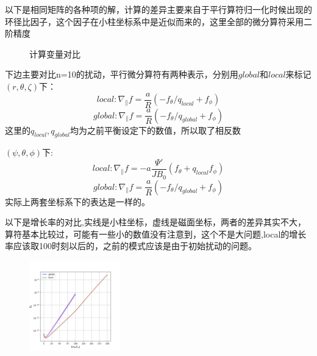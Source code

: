 \documentclass[11pt,a4paper]{article}
\begin{document}
以下是相同矩阵的各种项的解，计算的差异主要来自于平行算符归一化时候出现的环径比因子，这个因子在小柱坐标系中是近似而来的，这里全部的微分算符采用二阶精度
\begin{figure}[H]
	\centering
	\caption{计算变量对比}
\end{figure}


下边主要对比n=10的扰动，平行微分算符有两种表示，分别用$global$和$local$来标记\\
$(r,\theta,\zeta)$下：
$$ local: \nabla_{\parallel}{f} = \frac{a}{R}( -f_{\theta}/q_{local}+f_\phi ) $$
$$ global: \nabla_{\parallel}{f} = \frac{a}{R}(-f_{\theta}/q_{global}+f_\phi ) $$
这里的$q_{local},q_{global}$均为之前平衡设定下的数值，所以取了相反数

$(\psi,\theta,\phi)$下:
$$ local: \nabla_{\parallel}{f} = -a\frac{\Psi'}{JB_0}( f_{\theta}+q_{local}f_\phi ) $$
$$ global: \nabla_{\parallel}{f} = \frac{a}{R}(-f_{\theta}/q_{global}+f_\phi ) $$
实际上两套坐标系下的表达是一样的。

以下是增长率的对比,实线是小柱坐标，虚线是磁面坐标，两者的差异其实不大，算符基本比较过，可能有一些小的数值没有注意到，这个不是大问题,local的增长率应该取100时刻以后的，之前的模式应该是由于初始扰动的问题。
\begin{figure}[H]
	\centering
	\includegraphics[width=0.35\textwidth]{../psi-code/f2d/E_global_local.png}
	\caption{}
\end{figure}
\end{document}
